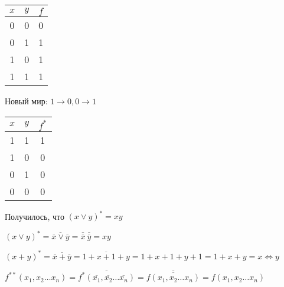 \documentclass[russian]{lecture-notes}
\begin{document}
\begin{sloppypar}
\begin{example}
            \begin{table}[h!]
                \centering
                \begin{tabular}{|c|c|c|}
                    \hline
                    $x$ & $y$ & $f$ \\ \hline
                    0      & 0   & 0   \\ \hline
                    0      & 1   & 1   \\ \hline
                    1      & 0   & 1   \\ \hline
                    1      & 1   & 1   \\ \hline
                \end{tabular}
            \end{table}

            Новый мир: $1 \rightarrow 0, 0 \rightarrow 1$

            \begin{table}[h!]
                \centering
                \begin{tabular}{|c|c|c|}
                    \hline
                    $x$ & $y$ & $f^*$ \\ \hline
                    1      & 1   & 1     \\ \hline
                    1      & 0   & 0     \\ \hline
                    0      & 1   & 0     \\ \hline
                    0      & 0   & 0     \\ \hline
                \end{tabular}
            \end{table}

            Получилось, что $(x \lor y)^* = xy$
        \end{example}

        \begin{example}
            $(x \lor y)^* = \overline{\overline{x} \lor \overline{y}} = \overline{\overline{x}} \: \overline{\overline{y}} = xy$
        \end{example}

        \begin{example}
            $(x + y)^* = \overline{\overline{x} + \overline{y}} = \overline{1 + x + 1 + y} = 1 + x + 1 + y + 1 = 1 + x + y = x \Leftrightarrow y$
        \end{example}

        \begin{remark}
            $f^{**}(x_1, x_2 \dots x_n) = \overline{f^*(\overline{x_1}, \overline{x_2} \dots \overline{x_n})} = \overline{\overline{f(x_1, x_2 \dots x_n)}} = f(x_1, x_2 \dots x_n)$
        \end{remark}


\end{sloppypar}
\end{document}
